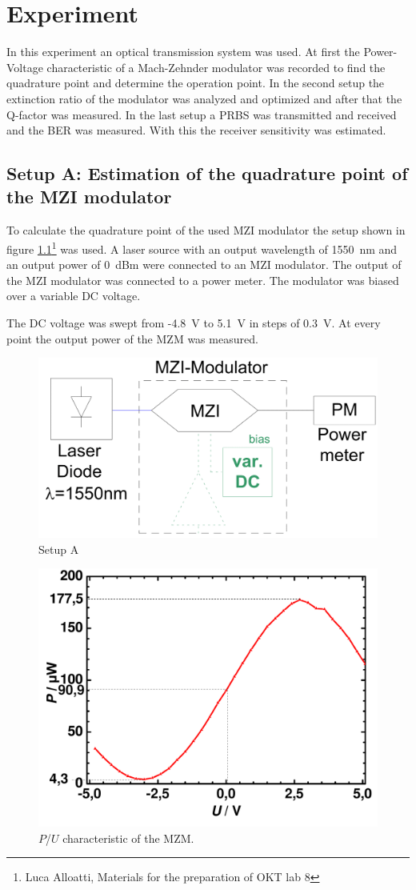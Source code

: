 \chapter{Experiment}
In this experiment an optical transmission system was used. At first the Power-Voltage characteristic of a Mach-Zehnder modulator was recorded to find the quadrature point and determine the operation point. In the second setup the extinction ratio of the modulator was analyzed and optimized and after that the Q-factor was measured. In the last setup a PRBS was transmitted and received and the BER was measured. With this the receiver sensitivity was estimated.  

\section{Setup A: Estimation of the quadrature point of the MZI modulator}
To calculate the quadrature point of the used MZI modulator the setup shown in figure \ref{fig:A_setup}\footnote[3]{Luca Alloatti, Materials for the preparation of OKT lab 8} was used. A laser source with an output wavelength of 1550~nm and an output power of 0~dBm were connected to an MZI modulator. The output of the MZI modulator was connected to a power meter. The modulator was biased over a variable DC voltage.

The DC voltage was swept from -4.8~V to 5.1~V in steps of 0.3~V. At every point the output power of the MZM was measured.

\begin{figure}%
\centering
\includegraphics[width=.5\columnwidth]{Grafiken/SetupA.png}%
\caption{Setup A}%
\label{fig:A_setup}%
\end{figure}

\begin{figure}%
\centering
\includegraphics[width=.6\columnwidth]{Grafiken/A_quadratur.pdf}%
\caption{$P$/$U$ characteristic of the MZM.}%
\label{fig:A_quadratur}%
\end{figure}

